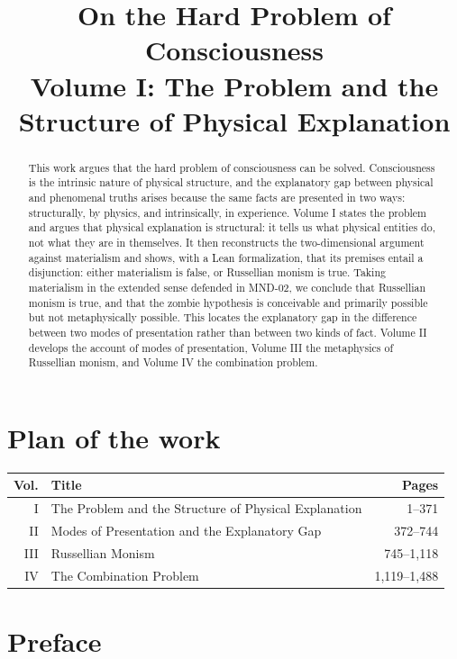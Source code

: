 \documentclass{situationist-preprint}
\title{On the Hard Problem of Consciousness\\[0.4em]\large Volume I: The Problem and the Structure of Physical Explanation}
\begin{document}
\maketitle

\begin{abstract}
This work argues that the hard problem of consciousness can be solved. Consciousness is the intrinsic nature of physical structure, and the explanatory gap between physical and phenomenal truths arises because the same facts are presented in two ways: structurally, by physics, and intrinsically, in experience. Volume I states the problem and argues that physical explanation is structural: it tells us what physical entities do, not what they are in themselves. It then reconstructs the two-dimensional argument against materialism and shows, with a Lean formalization, that its premises entail a disjunction: either materialism is false, or Russellian monism is true. Taking materialism in the extended sense defended in MND-02, we conclude that Russellian monism is true, and that the zombie hypothesis is conceivable and primarily possible but not metaphysically possible. This locates the explanatory gap in the difference between two modes of presentation rather than between two kinds of fact. Volume II develops the account of modes of presentation, Volume III the metaphysics of Russellian monism, and Volume IV the combination problem.
\end{abstract}

\section*{Plan of the work}

\begin{center}\small
\begin{tabular}{@{}rlr@{}}
\toprule
Vol. & Title & Pages \\
\midrule
I & The Problem and the Structure of Physical Explanation & 1--371 \\
II & Modes of Presentation and the Explanatory Gap & 372--744 \\
III & Russellian Monism & 745--1,118 \\
IV & The Combination Problem & 1,119--1,488 \\
\bottomrule
\end{tabular}
\end{center}

\section*{Preface}
\end{document}
